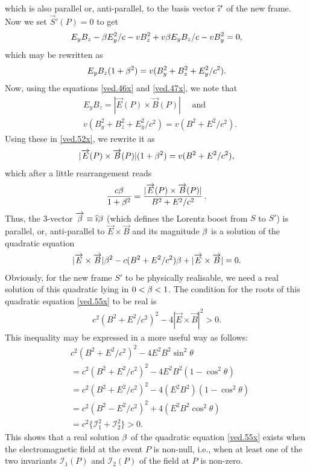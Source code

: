 which is also parallel or, anti-parallel, to the basis 
vector ${\widehat{\imath}}'$ of the new frame. Now we set $\vec{S}'(P) =0 
$ 
to get
\begin{align*}
E_yB_z-{\beta} E_y^2/c - v B_z^2+v{\beta} E_y B_z/c-vB_y^2=0,
\end{align*}
which may be rewritten as
\begin{align}\label{ved.52x}
E_yB_z(1+{\beta}^2) =v(B_y^2 +B_z^2 +E_y^2/c^2).
\end{align}
Now, using the equations \eqref{ved.46x} and
\eqref{ved.47x}, we note  that    
\begin{align*}
& E_yB_z=|\vec{E}(P)\times
\vec{B}(P)| \quad \text{ and } \\ &v(B_y^2 +B_z^2 
+E_y^2/c^2)
=v(B^2+E^2/c^2).
\end{align*}
Using these in \eqref{ved.52x}, we rewrite it as
\begin{align}\label{ved.53x}
|\overrightarrow{E}(P)\times
\overrightarrow{B}(P)|(1+{\beta}^2) =v(B^2+E^2/c^2),
\end{align}
which after a little rearrangement reads
\begin{align}\label{ved.54x}
\frac{c{\beta}}{1+{\beta}^2}=
\frac{|\overrightarrow{E}(P) \times \overrightarrow{B}(P)|}
{B^2 +E^2/c^2}\,.
\end{align}
Thus, the 3-vector $\overrightarrow{{\beta}}\equiv {\ensuremath{\widehat{\imath}}} {\beta}$ (which 
defines the Lorentz boost from $S$ to $S'$) is parallel, 
or, 
anti-parallel to $\vec{E}\times \vec{B}$ and its magnitude 
${\beta}$ is a solution of the quadratic equation
\begin{align}\label{ved.55x}
|\overrightarrow{E}\times \overrightarrow{B}|{\beta}^2- c(B^2 +E^2/c^2){\beta}
+|\overrightarrow{E}\times \overrightarrow{B}|=0.
\end{align}
Obviously, for the new frame $S'$ to be physically 
realisable, we need a real solution of this quadratic lying 
in $0<{\beta} <1$. The condition for the roots of this 
quadratic equation
\eqref{ved.55x} to be real is
\begin{align}\label{ved.56x}
c^2(B^2 +E^2/c^2)^2-4|\vec{E}\times \vec{B}|^2>0.
\end{align}
This inequality may be expressed in a more useful way as
follows:\\
\vse\begin{align*}
& c^2 (B^2 +E^2/c^2)^2-4E^2 B^2\sin^2\theta \\
&=c^2(B^2 +E^2/c^2)^2-4E^2B^2(1-\cos^2\theta)\\
&=c^2(B^2 +E^2/c^2)^2-4(E^2B^2)(1-\cos^2\theta) \\
& = c^2(B^2 -E^2/c^2)^2+4 (E^2B^2\cos^2\theta)\\ 
&= c^2\{\mathcal{I}_1^2 +\mathcal{I}_2^2\}>0.
\end{align*}
This shows that a real solution ${\beta}$ of the quadratic 
equation \eqref{ved.55x} exists when the electromagnetic 
field at the event $P$ is non-null, i.e., when at least one 
of the two invariants $\mathcal{I}_1(P)$ and 
$\mathcal{I}_2(P)$ of the field at $P$ is non-zero.

